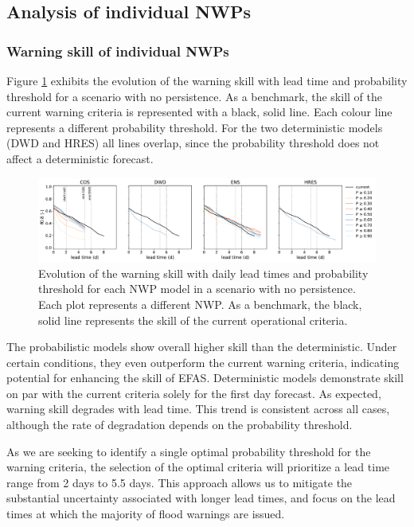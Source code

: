 \documentclass{ametsocV6.1}
\begin{document}
\subsection{Analysis of individual NWPs}
\label{sec:results_NWP}

\subsubsection{Warning skill of individual NWPs}
\label{sec:NWP_skill}

Figure \ref{fig:NWP_skill_leadtime} exhibits the evolution of the warning skill with lead time and probability threshold for a scenario with no persistence.  As a benchmark, the skill of the current warning criteria is represented with a black, solid line. Each colour line represents a different probability threshold. For the two deterministic models (DWD and HRES) all lines overlap, since the probability threshold does not affect a deterministic forecast.

\begin{figure}
    \centering
    \includegraphics[width=1\textwidth]{figure02.pdf}
    \caption{Evolution of the warning skill with daily lead times and probability threshold for each NWP model in a scenario with no persistence. Each plot represents a different NWP. As a benchmark, the black, solid line represents the skill of the current operational criteria.}
    \label{fig:NWP_skill_leadtime}
\end{figure}

The probabilistic models show overall higher skill than the deterministic. Under certain conditions, they even outperform the current warning criteria, indicating potential for enhancing the skill of EFAS. Deterministic models demonstrate skill on par with the current criteria solely for the first day forecast. As expected, warning skill degrades with lead time. This trend is consistent across all cases, although the rate of degradation depends on the probability threshold.

As we are seeking to identify a single optimal probability threshold for the warning criteria, the selection of the optimal criteria will prioritize a lead time range from 2 days to 5.5 days. This approach allows us to mitigate the substantial uncertainty associated with longer lead times, and focus on the lead times at which the majority of flood warnings are issued.
\end{document}
